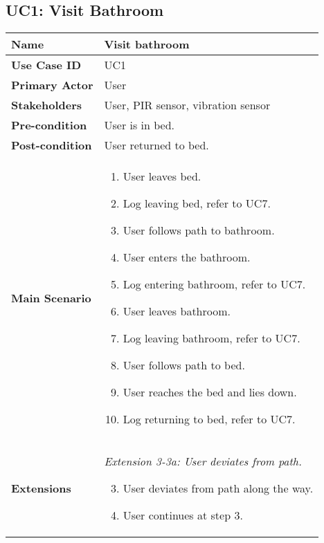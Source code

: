 \subsection{UC1: Visit Bathroom}
    \begin{tabular}{|p{}||p{}|}
        \hline
        \textbf{Name} & Visit bathroom \\
        \hline
        \textbf{Use Case ID} & UC1 \\
        \hline
        \textbf{Primary Actor} & User\\
        \hline
        \textbf{Stakeholders} & User, PIR sensor, vibration sensor\\
        \hline
        \textbf{Pre-condition} & User is in bed.\\
        \hline
        \textbf{Post-condition} & User returned to bed.\\
        \hline
        \textbf{Main Scenario} & 
            \begin{enumerate}
                \item User leaves bed.
                \item Log leaving bed, refer to UC7.
                \item User follows path to bathroom.
                \item User enters the bathroom.
                \item Log entering bathroom, refer to UC7.
                \item User leaves bathroom.
                \item Log leaving bathroom, refer to UC7.
                \item User follows path to bed.
                \item User reaches the bed and lies down.
                \item Log returning to bed, refer to UC7.
            \end{enumerate}\\
        \hline
        \textbf{Extensions} &
        \textit{Extension 3-3a: User deviates from path.}
        
        \begin{enumerate}
            \setcounter{enumi}{2}
            \item User deviates from path along the way.
            \item User continues at step 3.
        \end{enumerate}
        

\end{tabular}
